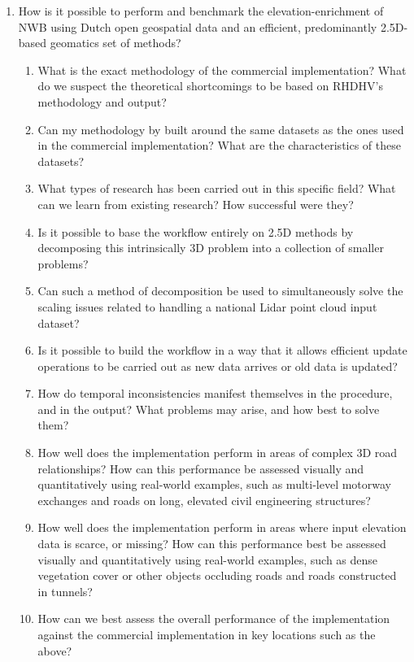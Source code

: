 \begin{enumerate}
    \item How is it possible to perform and benchmark the elevation-enrichment of NWB using Dutch open geospatial data and an efficient, predominantly 2.5D-based geomatics set of methods?
    \begin{enumerate}
        \item What is the exact methodology of the commercial implementation? What do we suspect the theoretical shortcomings to be based on RHDHV's methodology and output?
        \item Can my methodology by built around the same datasets as the ones used in the commercial implementation? What are the characteristics of these datasets?
        \item What types of research has been carried out in this specific field? What can we learn from existing research? How successful were they?
        \item Is it possible to base the workflow entirely on 2.5D methods by decomposing this intrinsically 3D problem into a collection of smaller problems?
        \item Can such a method of decomposition be used to simultaneously solve the scaling issues related to handling a national Lidar point cloud input dataset?
        \item Is it possible to build the workflow in a way that it allows efficient update operations to be carried out as new data arrives or old data is updated?
        \item How do temporal inconsistencies manifest themselves in the procedure, and in the output? What problems may arise, and how best to solve them?
        \item How well does the implementation perform in areas of complex 3D road relationships? How can this performance be assessed visually and quantitatively using real-world examples, such as multi-level motorway exchanges and roads on long, elevated civil engineering structures?
        \item How well does the implementation perform in areas where input elevation data is scarce, or missing? How can this performance best be assessed visually and quantitatively using real-world examples, such as dense vegetation cover or other objects occluding roads and roads constructed in tunnels?
        \item How can we best assess the overall performance of the implementation against the commercial implementation in key locations such as the above?

\end{enumerate}
\end{enumerate}
